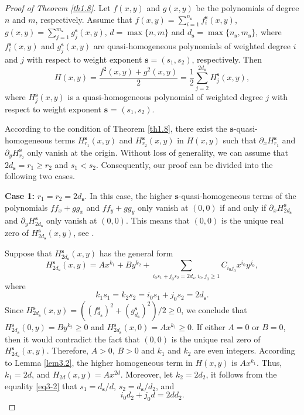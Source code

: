 \documentclass[reqno]{amsart}
\begin{document}
\begin{proof}[Proof of Theorem \ref{th1.8}]
Let $f(x,y)$ and $g(x,y)$  be the polynomials of degree $n$ and $m$, respectively. 
Assume that $f(x,y)=\sum_{i=1}^{n_{\mathbf{s}}}f^{\mathbf{s}}_{i}(x,y)$, 
$g(x,y)=\sum_{j=1}^{m_{\mathbf{s}}}g^{\mathbf{s}}_{j}(x,y)$, $d=\max\{n,m\}$ and 
$d_{\mathbf{s}}=\max\{n_{\mathbf{s}},m_{\mathbf{s}}\}$, where 
$f^{\mathbf{s}}_{i}(x,y)$ and $g^{\mathbf{s}}_{j}(x,y)$ are quasi-homogeneous 
polynomials of weighted degree $i$ and $j$ with respect to weight exponent 
$\mathbf{s}=(s_1,s_2)$, respectively. Then
\[
H(x,y)=\frac{f^2(x,y)+g^2(x,y)}{2}
=\frac{1}{2}\sum_{j=2}^{2d_{\mathbf{s}}}H^{\mathbf{s}}_{j}(x,y),
\]
where $H^{\mathbf{s}}_j(x,y)$ is a quasi-homogeneous polynomial of weighted degree 
$j$ with respect to weight exponent $\mathbf{s}$ = $(s_1,s_2)$.

According to the condition of Theorem \ref{th1.8}, there exist the 
$\mathbf{s}$-quasi-homogeneous terms  $H^{\mathbf{s}}_{r_1}(x,y)$ and 
$H^{\mathbf{s}}_{r_2}(x,y)$ in  $H(x,y)$ such that
$\partial_{x}H^{\mathbf{s}}_{r_1}$ and $\partial_{y}H^{\mathbf{s}}_{r_2}$ only 
vanish at the origin. Without loss of generality, we can assume that 
$2d_{\mathbf{s}}=r_1\geq r_2$ and $s_1<s_2$. Consequently, our proof can be divided into 
the following two cases.
\smallskip

\noindent\textbf{Case 1:} $r_1=r_2=2d_{\mathbf{s}}$.
In this case, the higher $\mathbf{s}$-quasi-homogeneous terms of the polynomials 
$ ff_{x}+gg_{x} $ and $ ff_{y}+gg_{y} $ only vanish at $ (0,0) $ if and only if 
$\partial_{x}H^{\mathbf{s}}_{2d_{\mathbf{s}}}$ and 
$\partial_{y}H^{\mathbf{s}}_{2d_{\mathbf{s}}}$ only vanish at $ (0,0)$. 
This means that $(0,0)$ is the unique real zero of 
$H^{\mathbf{s}}_{2d_{\mathbf{s}}}(x,y)$, see \cite[Corollary 1]{bib 19}.

Suppose that $H^{\mathbf{s}}_{2d_{\mathbf{s}}}(x,y)$ has the general form
\begin{equation}\label{eq3-1}
H^{\mathbf{s}}_{2d_{\mathbf{s}}}(x,y)
=Ax^{k_1}+By^{k_2}+\sum_{i_0s_1+j_0s_2=2d_{\mathbf{s}}, 
i_0, j_0\geq1}C_{i_0j_0}x^{i_0}y^{j_0},
\end{equation}
where
\begin{equation}\label{eq3-2}
k_1s_1=k_2s_2=i_0s_1+j_0s_2=2d_{\mathbf{s}}.
\end{equation}
Since $H^{\mathbf{s}}_{2d_{\mathbf{s}}}(x,y)
=\left((f^{\mathbf{s}}_{d_{\mathbf{s}}})^2+(g^{\mathbf{s}}_{d_{\mathbf{s}}})^2
\right)/2\geq 0$, 
we conclude that $H^{\mathbf{s}}_{2d_{\mathbf{s}}}(0,y)=By^{k_2}\geq 0$ and 
$H^{\mathbf{s}}_{2d_{\mathbf{s}}}(x,0)=Ax^{k_1}\geq 0$. If either $A=0$ or $B=0$, 
then it would contradict the fact that $(0,0)$ is the unique real zero of 
$H^{\mathbf{s}}_{2d_{\mathbf{s}}}(x,y)$. Therefore, $A>0$, $B>0$ and $k_1$ and 
$k_2$ are even integers.
According to Lemma \ref{lem3.2}, the higher homogeneous term in $H(x,y)$ is $Ax^{k_1}$. 
Thus, $k_1=2d$, and $H_{2d}(x,y)=Ax^{2d}$. Moreover, let $k_2=2d_2$,
it follows from the equality \eqref{eq3-2} that $s_1=d_{\mathbf{s}}/d$, 
$s_2=d_{\mathbf{s}}/d_2$, and
\begin{equation}\label{eq3-3}
i_0d_2+j_0d=2dd_{2}.
\end{equation}


\end{proof}
\end{document}

